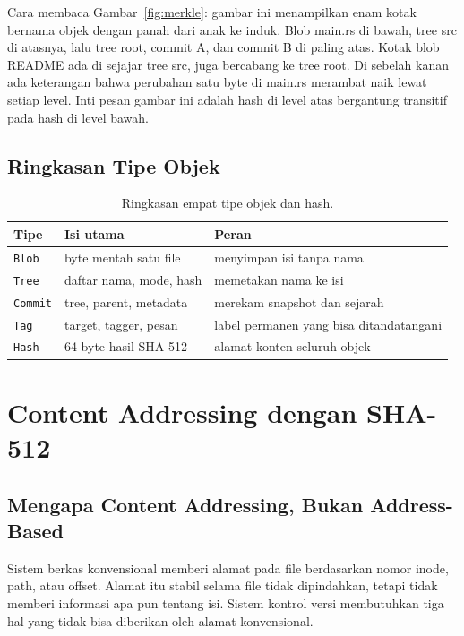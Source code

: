 \documentclass[11pt,a4paper]{article}
\begin{document}
Cara membaca Gambar~\ref{fig:merkle}: gambar ini menampilkan enam kotak bernama objek dengan panah dari anak ke induk. Blob main.rs di bawah, tree src di atasnya, lalu tree root, commit A, dan commit B di paling atas. Kotak blob README ada di sejajar tree src, juga bercabang ke tree root. Di sebelah kanan ada keterangan bahwa perubahan satu byte di main.rs merambat naik lewat setiap level. Inti pesan gambar ini adalah hash di level atas bergantung transitif pada hash di level bawah.

\subsection{Ringkasan Tipe Objek}

\begin{table}[H]
	\centering
	\caption{Ringkasan empat tipe objek dan hash.}
	\label{tab:types}
	\footnotesize
	\begin{tabularx}{\textwidth}{l X X}
		\toprule
		Tipe            & Isi utama               & Peran                                   \\
		\midrule
		\texttt{Blob}   & byte mentah satu file   & menyimpan isi tanpa nama                \\
		\texttt{Tree}   & daftar nama, mode, hash & memetakan nama ke isi                   \\
		\texttt{Commit} & tree, parent, metadata  & merekam snapshot dan sejarah            \\
		\texttt{Tag}    & target, tagger, pesan   & label permanen yang bisa ditandatangani \\
		\texttt{Hash}   & 64 byte hasil SHA-512   & alamat konten seluruh objek             \\
		\bottomrule
	\end{tabularx}
\end{table}

\section{Content Addressing dengan SHA-512}

\subsection{Mengapa Content Addressing, Bukan Address-Based}

Sistem berkas konvensional memberi alamat pada file berdasarkan nomor inode, path, atau offset. Alamat itu stabil selama file tidak dipindahkan, tetapi tidak memberi informasi apa pun tentang isi. Sistem kontrol versi membutuhkan tiga hal yang tidak bisa diberikan oleh alamat konvensional.
\end{document}
